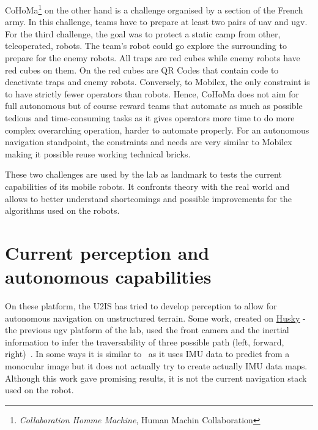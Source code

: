 CoHoMa\footnote{\textit{Collaboration Homme Machine}, Human Machin Collaboration} on the other hand is a challenge organised
by a section of the French army.
In this challenge, teams have to prepare at least two pairs of \gls{uav} and \gls{ugv}.
For the third challenge, the goal was to protect a static camp from other, teleoperated, robots.
The team's robot could go explore the surrounding to prepare for the enemy robots.
All traps are red cubes while enemy robots have red cubes on them.
On the red cubes are QR Codes that contain code to deactivate traps and enemy robots.
Conversely, to Mobilex, the only constraint is to have strictly fewer operators than robots.
Hence, CoHoMa does not aim for full autonomous but of course reward teams that automate as much as possible tedious
and time-consuming tasks as it gives operators more time to do more complex overarching operation, harder to
automate properly.
For an autonomous navigation standpoint, the constraints and needs are very similar to Mobilex making it possible
reuse working technical bricks.

These two challenges are used by the lab as landmark to tests the current capabilities of its mobile robots.
It confronts theory with the real world and allows to better understand shortcomings and possible improvements
for the algorithms used on the robots.


\section{Current perception and autonomous capabilities}\label{sec:current-perception-and-autonomous-capabilities}

On these platform, the U2IS has tried to develop perception to allow for autonomous navigation on unstructured terrain.
Some work, created on \href{https://clearpathrobotics.com/husky-a300-unmanned-ground-vehicle-robot/}{Husky} - the previous
\gls{ugv} platform of the lab, used the front camera and the inertial information to infer the traversability of three
possible path (left, forward, right)~\parencite{thomas_whojospatially-coherent-costmap_2024}.
In some ways it is similar to~\cite{fortin_uav-assisted_2024} as it uses IMU data to predict from a monocular image but
it does not actually try to create actually IMU data maps.\\
Although this work gave promising results, it is not the current navigation stack used on the robot.

